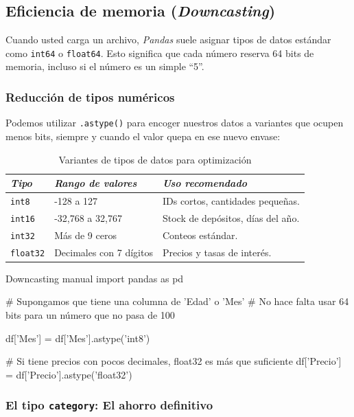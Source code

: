 \subsection{Eficiencia de memoria (\textit{Downcasting})}

Cuando usted carga un archivo, \textit{Pandas} suele asignar tipos de datos estándar como \texttt{int64} o \texttt{float64}. Esto significa que cada número reserva 64 bits de memoria, incluso si el número es un simple ``5''.

\subsubsection{Reducción de tipos numéricos}

Podemos utilizar \texttt{.astype()} para encoger nuestros datos a variantes que ocupen menos bits, siempre y cuando el valor quepa en ese nuevo envase:

\begin{table}[h]
\centering
\begin{tabular}{|l|l|l|}
\hline
\textit{Tipo} & \textit{Rango de valores} & \textit{Uso recomendado} \\ \hline
\texttt{int8} & -128 a 127 & IDs cortos, cantidades pequeñas. \\ \hline
\texttt{int16} & -32,768 a 32,767 & Stock de depósitos, días del año. \\ \hline
\texttt{int32} & Más de 9 ceros & Conteos estándar. \\ \hline
\texttt{float32} & Decimales con 7 dígitos & Precios y tasas de interés. \\ \hline
\end{tabular}
\caption{Variantes de tipos de datos para optimización}
\end{table}

\begin{pycode}{Downcasting manual}
import pandas as pd

# Supongamos que tiene una columna de 'Edad' o 'Mes'
# No hace falta usar 64 bits para un número que no pasa de 100

df['Mes'] = df['Mes'].astype('int8')

# Si tiene precios con pocos decimales, float32 es más que suficiente
df['Precio'] = df['Precio'].astype('float32')
\end{pycode}

\subsubsection{El tipo \texttt{category}: El ahorro definitivo}

